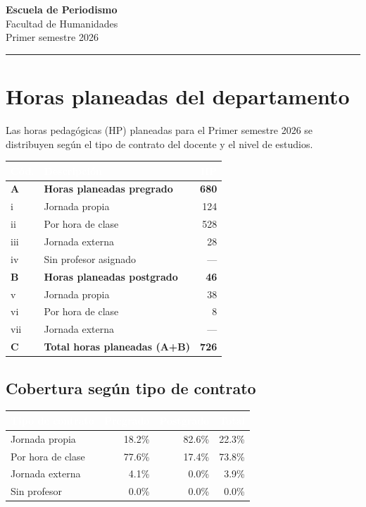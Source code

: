 \documentclass[11pt, a4paper]{article}
\begin{document}
\begin{center}
  {\Large\bfseries\color{usachDark} Escuela de Periodismo} \\[0.4em]
  {\large\color{usachTeal} Facultad de Humanidades} \\[0.2em]
  {\normalsize\color{gray} Primer semestre 2026}
\end{center}
\vspace{0.5em}
\textcolor{usachTeal}{\rule{\linewidth}{2pt}}
\vspace{1em}

\section{Horas planeadas del departamento}

Las horas pedagógicas (HP) planeadas para el Primer semestre 2026 se distribuyen según el tipo de contrato del docente y el nivel de estudios.

\begin{tabularx}{\linewidth}{l X r}
\toprule
\rowcolor{usachDark} \textbf{\textcolor{white}{Cód.}} & \textbf{\textcolor{white}{Descripción}} & \textbf{\textcolor{white}{HP}} \\
\midrule
\rowcolor{rowHighlight}\textbf{A} & \textbf{Horas planeadas pregrado} & \textbf{680} \\
\rowcolor{rowEven}i & Jornada propia & 124 \\
ii & Por hora de clase & 528 \\
\rowcolor{rowEven}iii & Jornada externa & 28 \\
iv & Sin profesor asignado & --- \\
\rowcolor{rowHighlight}\textbf{B} & \textbf{Horas planeadas postgrado} & \textbf{46} \\
v & Jornada propia & 38 \\
\rowcolor{rowEven}vi & Por hora de clase & 8 \\
vii & Jornada externa & --- \\
\rowcolor{rowHighlight}\textbf{C} & \textbf{Total horas planeadas (A+B)} & \textbf{726} \\
\bottomrule
\end{tabularx}

\subsection{Cobertura según tipo de contrato}

\begin{tabular}{lrrr}
\toprule
\rowcolor{usachDark} \textbf{\textcolor{white}{Tipo de contrato}} & \textbf{\textcolor{white}{Pregrado}} & \textbf{\textcolor{white}{Postgrado}} & \textbf{\textcolor{white}{Total}} \\
\midrule
Jornada propia & 18.2\% & 82.6\% & 22.3\% \\
\rowcolor{rowEven}Por hora de clase & 77.6\% & 17.4\% & 73.8\% \\
Jornada externa & 4.1\% & 0.0\% & 3.9\% \\
\rowcolor{rowEven}Sin profesor & 0.0\% & 0.0\% & 0.0\% \\
\bottomrule
\end{tabular}
\end{document}
